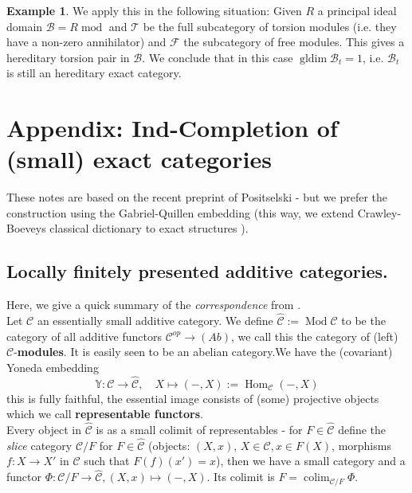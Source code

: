 \documentclass[11pt,a4paper]{amsart}
\theoremstyle{plain}
\theoremstyle{definition}
\newtheorem{exa}[thm]{Example}
\DeclareMathOperator{\Hom}{Hom}
\DeclareMathOperator{\modu}{mod}
\DeclareMathOperator{\Modu}{Mod}
\DeclareMathOperator{\gldim}{gldim}
\DeclareMathOperator*{\colim}{colim}
\newcommand{\mcB}{\mathcal{B}}
\newcommand{\mcC}{\mathcal{C}}
\newcommand{\mcF}{\mathcal{F}}
\newcommand{\mcT}{\mathcal{T}}
\begin{document}
\begin{exa}
We apply this in the following situation: Given $R$ a principal ideal domain  $\mcB=R\modu$ and $\mcT$ be the full subcategory of torsion modules (i.e. they have a non-zero annihilator) and $\mcF$ the subcategory of free modules. This gives a hereditary torsion pair in $\mcB$. We conclude that in this case $\gldim \mcB_t=1$, i.e. $\mcB_t$ is still an hereditary exact category. 
\end{exa}


\section{Appendix: Ind-Completion of (small) exact categories}

These notes are based on the recent preprint of Positselski \cite{P-locCoh} - but we prefer the construction using the Gabriel-Quillen embedding (this way, we extend Crawley-Boeveys classical dictionary to exact structures \cite{CB}). 

\subsection*{Locally finitely presented additive categories. }


Here, we give a quick summary of the \emph{correspondence} from \cite{CB}.\\


Let $\mcC$ an essentially small additive category. We define $\hat{\mcC}:=\Modu \mcC$ to be the category of all additive functors $\mcC^{op} \to (Ab)$, we call this the category of (left) $\mcC$-\textbf{modules}. It is easily seen to be an abelian category.We have the (covariant) Yoneda embedding 
\[
\mathbb{Y} \colon \mcC \to \hat{\mcC}, \quad X \mapsto (-,X):= \Hom_{\mcC} (-, X) 
\]
this is fully faithful, the essential image consists of (some) projective objects which we call \textbf{representable functors}.\\ 
 Every object in $\hat{\mcC}$ is as a small colimit of representables %
 - for $F \in \hat{\mcC}$ define the \emph{slice} category $\mcC / F$ for $F\in \hat{\mcC}$ (objects: $(X,x)$, $X\in \mcC , x\in F(X)$, morphisms $f\colon X\to X'$ in $\mcC$ such that $F(f)(x')=x$), then we have a small category and a functor $\Phi \colon \mcC/F\to \hat{\mcC}, (X,x)\mapsto (-,X)$. Its colimit is $F=\colim_{\mcC/F} \Phi$. 
\end{document}
